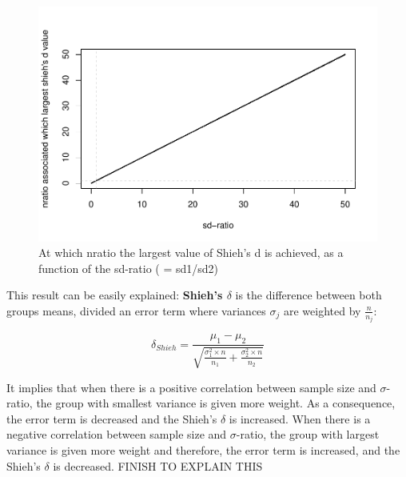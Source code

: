 \documentclass[man,floatsintext]{apa6}
\begin{document}
\begin{figure}
\centering
\includegraphics{The-shieh-s-and-its-relation-with-Cohen-s-d_files/figure-latex/SHIEH5-1.pdf}
\caption{\label{fig:SHIEH5}At which nratio the largest value of Shieh's d is achieved, as a function of the sd-ratio ( = sd1/sd2)}
\end{figure}

This result can be easily explained: \textbf{Shieh's \(\delta\)} is the difference between both groups means, divided an error term where variances \(\sigma_{j}\) are weighted by \(\frac{n}{n_{j}}\):

\begin{equation} 
\delta_{Shieh}= \frac{\mu_{1}-\mu_{2}}{\sqrt{\frac{\sigma^2_{1} \times n}{n_{1}}+\frac{\sigma^2_{2} \times n}{n_{2}}}}
\label{eq:shieh}
\end{equation}

It implies that when there is a positive correlation between sample size and \(\sigma\)-ratio, the group with smallest variance is given more weight. As a consequence, the error term is decreased and the Shieh's \(\delta\) is increased. When there is a negative correlation between sample size and \(\sigma\)-ratio, the group with largest variance is given more weight and therefore, the error term is increased, and the Shieh's \(\delta\) is decreased. FINISH TO EXPLAIN THIS
\end{document}
